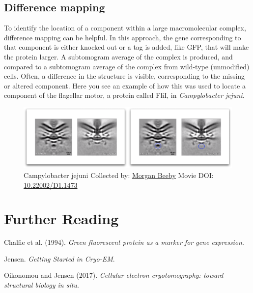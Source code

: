 \documentclass[]{tufte-book}
\begin{document}
\hypertarget{Difference_mapping}{\subsection{Difference
mapping}\label{Difference_mapping}}

To identify the location of a component within a large macromolecular
complex, difference mapping can be helpful. In this approach, the gene
corresponding to that component is either knocked out or a tag is added,
like GFP, that will make the protein larger. A subtomogram average of
the complex is produced, and compared to a subtomogram average of the
complex from wild-type (unmodified) cells. Often, a difference in the
structure is visible, corresponding to the missing or altered component.
Here you see an example of how this was used to locate a component of
the flagellar motor, a protein called FliI, in \emph{Campylobacter
jejuni}.





\begin{figure}
\includegraphics{movie_stills/1_10a} \caption[Campylobacter jejuni Collected by:
\protect\hyperlink{morgan_beeby}{Morgan Beeby} Movie DOI:
\href{https://doi.org/10.22002/D1.1473}{10.22002/D1.1473}]{Campylobacter jejuni Collected by:
\protect\hyperlink{morgan_beeby}{Morgan Beeby} Movie DOI:
\href{https://doi.org/10.22002/D1.1473}{10.22002/D1.1473}}\label{fig:1-10a}
\end{figure}

\section{Further Reading}\label{further-reading}

Chalfie et al. (1994). \emph{Green fluorescent protein as a marker for
gene expression}.\citep{chalfie1994}

Jensen. \emph{Getting Started in Cryo-EM}.\citep{jensenInternet}

Oikonomou and Jensen (2017). \emph{Cellular electron cryotomography:
toward structural biology in situ}.\citep{oikonomou2017}
\end{document}
